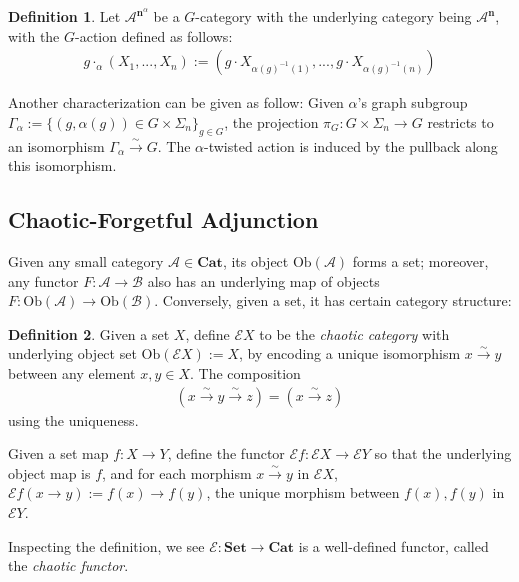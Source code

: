 \documentclass[openany, amssymb, psamsfonts]{amsart}
\theoremstyle{definition}
\newtheorem{defn}{Definition}[section]
\numberwithin{equation}{section}
\newcommand{\Cat}{\mathbf{Cat}} %
\newcommand{\Sets}{\mathbf{Set}} %
\newcommand{\A}{\mathscr{A}}
\newcommand{\B}{\mathscr{B}}
\newcommand{\Ob}{\mathrm{Ob}}%
\begin{document}
\begin{defn}
    Let $\A^{\mathbf{n}^\alpha}$ be a $G$-category with the underlying category being $\A^\mathbf{n}$, with the $G$-action defined as follows:
    \begin{align*}
        g\cdot_\alpha (X_1,...,X_n):= (g\cdot X_{\alpha(g)^{-1}(1)},...,g\cdot X_{\alpha(g)^{-1}(n)})
    \end{align*}
\end{defn}
Another characterization can be given as follow: Given $\alpha$'s graph subgroup $\Gamma_\alpha:= \{(g,\alpha(g))\in G\times\Sigma_n\}_{g\in G}$, the projection $\pi_G:G\times\Sigma_n\rightarrow G$ restricts to an isomorphism $\Gamma_\alpha\xrightarrow{\sim}G$. The $\alpha$-twisted action is induced by the pullback along this isomorphism.

\vspace{1pt}

\subsection{Chaotic-Forgetful Adjunction}\label{sub_chaot_adj}

Given any small category $\A\in\Cat$, its object $\Ob(\A)$ forms a set; moreover, any functor $F:\A\rightarrow\B$ also has an underlying map of objects $F:\Ob(\A)\rightarrow\Ob(\B)$. Conversely, given a set, it has certain category structure:

\begin{defn}\label{defn_chaot}
    Given a set $X$, define $\mathscr{E}X$ to be the \emph{chaotic category} with underlying object set $\Ob(\mathscr{E}X):=X$, by encoding a unique isomorphism $x\xrightarrow{\sim} y$ between any element $x,y\in X$. The composition 
    \begin{align}
        (x\xrightarrow{\sim}y \xrightarrow{\sim}z) = (x\xrightarrow{\sim}z)
    \end{align}
    using the uniqueness.

    \vspace{1pt}

    Given a set map $f:X\rightarrow Y$, define the functor $\mathscr{E}f:\mathscr{E}X\rightarrow\mathscr{E}Y$ so that the underlying object map is $f$, and for each morphism $x\xrightarrow{\sim}y$ in $\mathscr{E}X$, $\mathscr{E}f(x\rightarrow y):= f(x)\rightarrow f(y)$, the unique morphism between $f(x),f(y)$ in $\mathscr{E}Y$.
\end{defn}

Inspecting the definition, we see $\mathscr{E}:\Sets\rightarrow\Cat$ is a well-defined functor, called the \emph{chaotic functor}.
\end{document}
